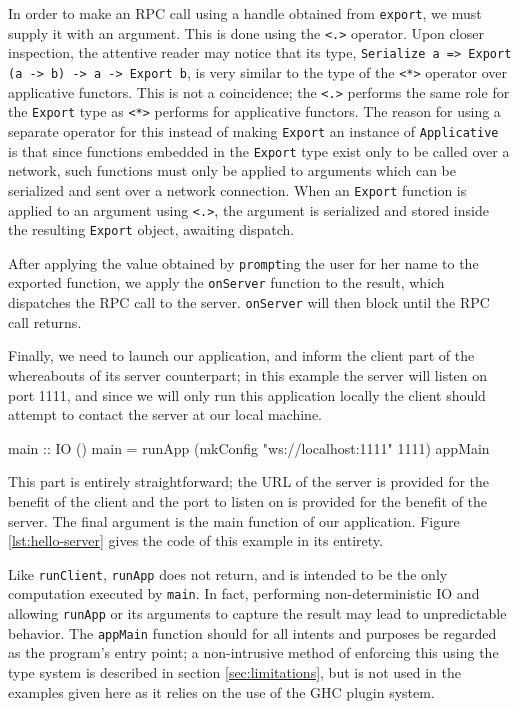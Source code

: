 \documentclass[preprint]{sigplanconf}
\begin{document}
In order to make an RPC call using a handle obtained from \lstinline!export!,
we must supply it with an argument. This is done using the \lstinline!<.>!
operator. Upon closer inspection, the attentive reader may notice that
\linebreak
its type, \lstinline!Serialize a => Export (a -> b) -> a -> Export b!,
is very similar to the type of the \lstinline!<*>! operator over applicative
functors. This is not a coincidence; the \lstinline!<.>! performs the same role
for the \lstinline!Export! type as \lstinline!<*>! performs for applicative
functors. The reason for using a separate operator for this instead of making
\lstinline!Export! an instance of \lstinline!Applicative! is that since
functions embedded in the \lstinline!Export! type exist only to be called over
a network, such functions must only be applied to arguments which can be
serialized and sent over a network connection. When an \lstinline!Export!
function is applied to an argument using \lstinline!<.>!, the argument is
serialized and stored inside the resulting \lstinline!Export! object, awaiting
dispatch.

After applying the value obtained by \lstinline!prompt!ing the user for her
name to the exported function, we apply the \lstinline!onServer! function to
the result, which dispatches the RPC call to the server. \lstinline!onServer!
will then block until the RPC call returns.

Finally, we need to launch our application, and inform the client part of the
whereabouts of its server counterpart; in this example the server will listen
on port 1111, and since we will only run this application locally the client
should attempt to contact the server at our local machine.

\begin{code}
main :: IO ()
main =
  runApp (mkConfig "ws://localhost:1111" 1111) appMain
\end{code}

This part is entirely straightforward; the URL of the server is provided for
the benefit of the client and the port to listen on is provided for the
benefit of the server. The final argument is the main function of our
application. Figure \ref{lst:hello-server} gives the code of this example in
its entirety.

Like \lstinline!runClient!, \lstinline!runApp! does not return, and is intended
to be the only computation executed by \lstinline!main!. In fact, performing
non-deterministic IO and allowing \lstinline!runApp! or its arguments to
capture the result may lead to unpredictable behavior. The \lstinline!appMain!
function should for all intents and purposes be regarded as the program's entry
point; a non-intrusive method of enforcing this using the type system is
described in section \ref{sec:limitations}, but is not used in the examples
given here as it relies on the use of the GHC plugin system.
\end{document}
